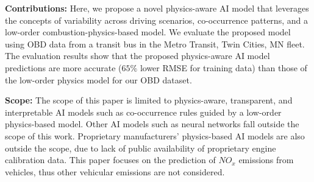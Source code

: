 \documentclass[letterpaper]{article} %
\begin{document}
{\bf Contributions:}
Here, we propose a novel physics-aware AI model that leverages the concepts of variability across driving scenarios, co-occurrence patterns, and a low-order combustion-physics-based model. We evaluate the proposed model using OBD data from a transit bus in the Metro Transit, Twin Cities, MN fleet. The evaluation results show that the proposed physics-aware AI model predictions are more accurate ($65\%$ lower RMSE for training data) than those of the low-order physics model for our OBD dataset. 


{\bf Scope:}
The scope of this paper is limited to physics-aware, transparent, and interpretable AI models such as co-occurrence rules guided by a low-order physics-based model. Other AI models such as neural networks fall outside the scope of this work. Proprietary manufacturers' physics-based AI models are also outside the scope, due to lack of public availability of proprietary engine calibration data. This paper focuses on the prediction of $NO_{x}$ emissions from vehicles, thus other vehicular emissions are not considered.
 


\end{document}
